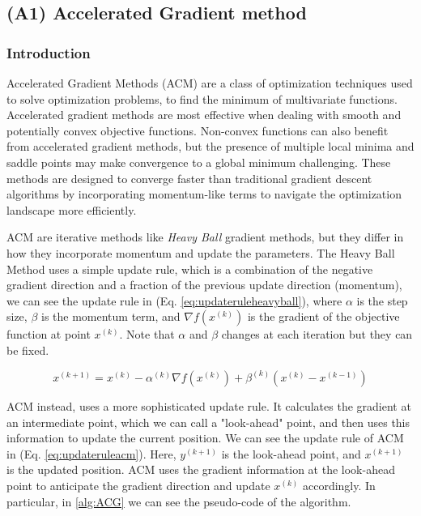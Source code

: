 \subsection{(A1) Accelerated Gradient method}

\subsubsection{Introduction}

Accelerated Gradient Methods (ACM) are a class of optimization techniques used to solve optimization problems, to find the minimum of multivariate functions. 
Accelerated gradient methods are most effective when dealing with smooth and potentially convex objective functions.
Non-convex functions can also benefit from accelerated gradient methods, but the presence of multiple local minima and saddle points may make convergence to a global minimum challenging.
These methods are designed to converge faster than traditional gradient descent algorithms by incorporating momentum-like terms to navigate the optimization landscape more efficiently.

ACM are iterative methods like \textit{Heavy Ball} \cite{heavyball} gradient methods, but they differ in how they incorporate momentum and update the parameters.
The Heavy Ball Method uses a simple update rule, which is a combination of the negative gradient direction and a fraction of the previous update direction (momentum), we can see the update rule in (Eq. \ref{eq:updateruleheavyball}), where $\alpha$ is the step size, $\beta$ is the momentum term, and $\nabla f(x^{(k)})$ is the gradient of the objective function at point $x^{(k)}$. Note that $\alpha$ and $\beta$ changes at each iteration but they can be fixed.

\begin{equation}
\label{eq:updateruleheavyball}
x^{(k+1)} = x^{(k)} - \alpha^{(k)} \nabla f(x^{(k)}) + \beta^{(k)}(x^{(k)} - x^{(k-1)})
\end{equation}


ACM instead, uses a more sophisticated update rule. It calculates the gradient at an intermediate point, which we can call a "look-ahead" point, and then uses this information to update the current position. 
We can see the update rule of ACM in (Eq. \ref{eq:updateruleacm}). 
Here, $y^{(k+1)}$ is the look-ahead point, and $x^{(k+1)}$ is the updated position. ACM uses the gradient information at the look-ahead point to anticipate the gradient direction and update $x^{(k)}$ accordingly. In particular, in \ref{alg:ACG} we can see the pseudo-code of the algorithm. 

